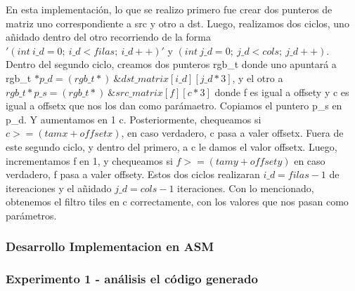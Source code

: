 En esta implementación, lo que se realizo primero fue crear dos punteros de matriz uno correspondiente a src y otro a dst.\newline
Luego, realizamos dos ciclos, uno añidado dentro del otro recorriendo de la forma $'(int\ i\_d = 0;\ i\_d < filas;\ i\_d++)'$ y 
$(int\ j\_d = 0;\ j\_d < cols;\ j\_d++)$.\newline
Dentro del segundo ciclo, creamos dos punteros rgb\_t donde uno apuntará a \newline rgb\_t $*p\_d = (rgb\_t*)\  \&dst\_matrix[i\_d][j\_d*3]$, y el otro
a $rgb\_t *p\_s = (rgb\_t*)\ \&src\_matrix[f][c*3]$ donde f es igual a offsety y c es igual a offsetx que nos los dan como parámaetro.\newline
Copiamos el puntero p\_s en p\_d. Y aumentamos en 1 c.\newline
Posteriormente, chequeamos si $c >= (tamx + offsetx)$, en caso verdadero, c pasa a valer offsetx.\newline
Fuera de este segundo ciclo, y dentro del primero, a c le damos el valor offsetx.\newline
Luego, incrementamos f en 1, y chequeamos si $f >= (tamy + offsety)$ en caso verdadero, f pasa a valer offsety.\newline
Estos dos ciclos realizaran $i\_d = filas -1$ de itereaciones y el añidado $j\_d = cols - 1$ iteraciones.\newline
Con lo mencionado, obtenemos el filtro tiles en c correctamente, con los valores que nos pasan como parámetros.\newline

\vspace*{0.3cm} \noindent
\subsubsection{Desarrollo Implementacion en ASM}



\vspace*{0.3cm} \noindent
\subsubsection{Experimento 1 - análisis el código generado}

